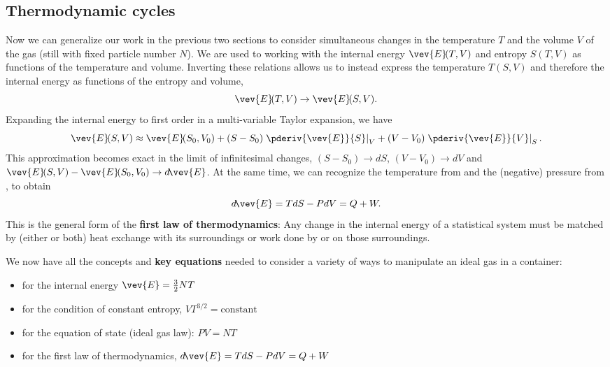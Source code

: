 \subsection{Thermodynamic cycles}
Now we can generalize our work in the previous two sections to consider simultaneous changes in the temperature $T$ and the volume $V$ of the gas (still with fixed particle number $N$).
We are used to working with the internal energy $\vev{E}\!(T, V)$ and entropy $S(T, V)$ as functions of the temperature and volume.
Inverting these relations allows us to instead express the temperature $T(S, V)$ and therefore the internal energy as functions of the entropy and volume,
\begin{equation*}
  \vev{E}\!(T, V) \to \vev{E}\!(S, V).
\end{equation*}
Expanding the internal energy to first order in a multi-variable Taylor expansion, we have
\begin{equation*}
  \vev{E}\!(S, V) \approx \vev{E}\!(S_0, V_0) + (S - S_0) \left.\pderiv{\vev{E}}{S}\right|_V + (V - V_0) \left.\pderiv{\vev{E}}{V}\right|_S.
\end{equation*}
This approximation becomes exact in the limit of infinitesimal changes, $(S - S_0) \to dS$, $(V - V_0) \to dV$ and $\vev{E}\!(S, V) - \vev{E}\!(S_0, V_0) \to d\!\vev{E}$.
At the same time, we can recognize the temperature from  and the (negative) pressure from , to obtain
\begin{equation}
  \label{eq:first_law}
  d\!\vev{E} = T dS - P dV = Q + W.
\end{equation}
This is the general form of the \textbf{first law of thermodynamics}: Any change in the internal energy of a statistical system must be matched by (either or both) heat exchange with its surroundings or work done by or on those surroundings.

\begin{shaded}
  We now have all the concepts and \textbf{key equations} needed to consider a variety of ways to manipulate an ideal gas in a container: \\[-24 pt]
  \begin{itemize}
    \item {} for the internal energy $\vev{E} = \frac{3}{2} NT$
    \item {} for the condition of constant entropy, $V T^{3/2} = \mbox{constant}$
    \item {} for the equation of state (ideal gas law): $PV = NT$
    \item {} for the first law of thermodynamics, $d\!\vev{E} = T dS - P dV = Q + W$
  \end{itemize}
\end{shaded}

